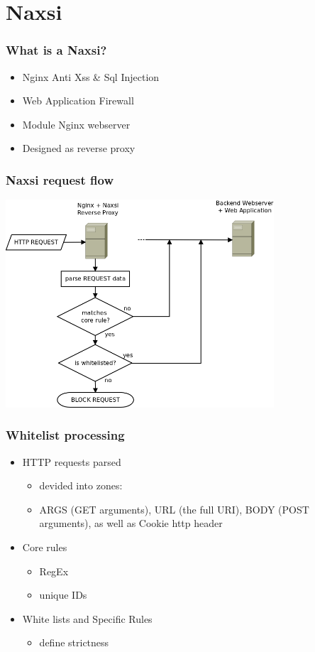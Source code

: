 \section{Naxsi}

\begin{frame}
  \frametitle{What is a Naxsi?}
   \begin{itemize}
   \item Nginx Anti Xss \& Sql Injection
   \item Web Application Firewall
   \item Module Nginx webserver
   \item Designed as reverse proxy
  \end{itemize}
\end{frame}

\begin{frame}
  \frametitle{Naxsi request flow}
    \begin{center} 
      \includegraphics[width=0.75\textwidth]{../paper/images/request_flow.png}
    \end{center}
\end{frame}


\begin{frame}
  \frametitle{Whitelist processing}
    \begin{itemize}
     \item HTTP requests parsed
      \begin{itemize}
        \item devided into zones:
	\item ARGS (GET arguments), URL (the full URI), BODY (POST arguments), as well as Cookie http header
      \end{itemize}
      \item Core rules
      \begin{itemize}
        \item RegEx
	\item unique IDs
      \end{itemize}
     \item White lists and Specific Rules
       \begin{itemize}
        \item define strictness
      \end{itemize}
  \end{itemize}
\end{frame}


